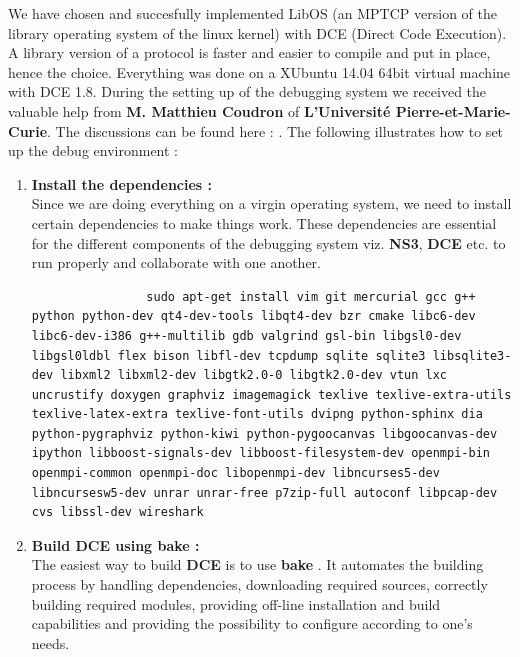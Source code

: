 \documentclass[a4paper,11pt]{article}
\begin{document}
		We have chosen and succesfully implemented LibOS \cite[LibOS]{libos} (an MPTCP version of the library operating system of the linux kernel) with DCE \cite[DCE]{dce} (Direct Code Execution). A library version of a protocol is faster and easier to compile and put in place, hence the choice. Everything was done on a XUbuntu 14.04 64bit virtual machine with DCE 1.8. During the setting up of the debugging system we received the valuable help from \textbf{M. Matthieu Coudron} of \textbf{L'Université Pierre-et-Marie-Curie}. The discussions can be found here : \cite[ns-3-dce]{ns-3-dce}. The following illustrates how to set up the debug environment :

		\begin{enumerate}
			
			\item \textbf{Install the dependencies :} \\Since we are doing everything on a virgin operating system, we need to install certain dependencies to make things work. These dependencies are essential for the different components of the debugging system viz. \textbf{NS3}, \textbf{DCE} etc. to run properly and collaborate with one another.
				
			\begin{lstlisting}
				sudo apt-get install vim git mercurial gcc g++ python python-dev qt4-dev-tools libqt4-dev bzr cmake libc6-dev libc6-dev-i386 g++-multilib gdb valgrind gsl-bin libgsl0-dev libgsl0ldbl flex bison libfl-dev tcpdump sqlite sqlite3 libsqlite3-dev libxml2 libxml2-dev libgtk2.0-0 libgtk2.0-dev vtun lxc uncrustify doxygen graphviz imagemagick texlive texlive-extra-utils texlive-latex-extra texlive-font-utils dvipng python-sphinx dia python-pygraphviz python-kiwi python-pygoocanvas libgoocanvas-dev ipython libboost-signals-dev libboost-filesystem-dev openmpi-bin openmpi-common openmpi-doc libopenmpi-dev libncurses5-dev libncursesw5-dev unrar unrar-free p7zip-full autoconf libpcap-dev cvs libssl-dev wireshark
			\end{lstlisting}

			\item \textbf{Build DCE using bake :} \\The easiest way to build \textbf{DCE} is to use \textbf{bake} \cite[bake]{bake}. It automates the building process by handling dependencies, downloading required sources, correctly building required modules, providing off-line installation and build capabilities and providing the possibility to configure according to one's needs.


\end{enumerate}
\end{document}

